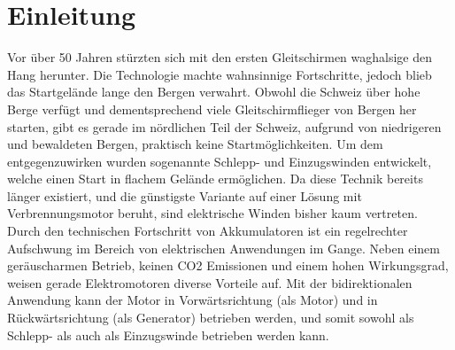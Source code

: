 \section{Einleitung}
Vor über 50 Jahren stürzten sich mit den ersten Gleitschirmen waghalsige den Hang herunter. Die Technologie machte wahnsinnige Fortschritte, jedoch blieb das Startgelände lange den Bergen verwahrt. Obwohl die Schweiz über hohe Berge verfügt und dementsprechend viele Gleitschirmflieger von Bergen her starten, gibt es gerade im nördlichen Teil der Schweiz, aufgrund von niedrigeren und bewaldeten Bergen, praktisch keine Startmöglichkeiten. Um dem entgegenzuwirken wurden sogenannte Schlepp- und Einzugswinden entwickelt, welche einen Start in flachem Gelände ermöglichen. Da diese Technik bereits länger existiert, und die günstigste Variante auf einer Lösung mit Verbrennungsmotor beruht, sind elektrische Winden bisher kaum vertreten. Durch den technischen Fortschritt von Akkumulatoren ist ein regelrechter Aufschwung im Bereich von elektrischen Anwendungen im Gange. Neben einem geräuscharmen Betrieb, keinen CO2 Emissionen und einem hohen Wirkungsgrad, weisen gerade Elektromotoren diverse Vorteile auf. Mit der bidirektionalen Anwendung kann der Motor in Vorwärtsrichtung (als Motor) und in Rückwärtsrichtung (als Generator) betrieben werden, und somit sowohl als Schlepp- als auch als Einzugswinde betrieben werden kann.